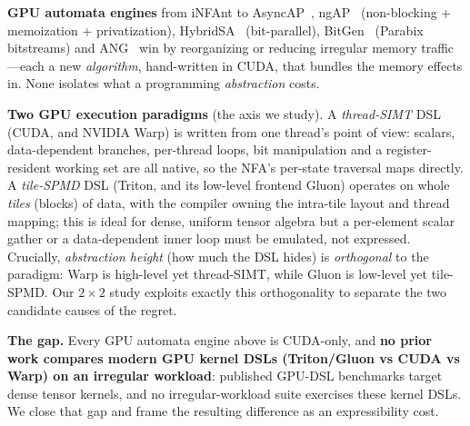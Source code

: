 \documentclass[conference]{IEEEtran}
\begin{document}
\textbf{GPU automata engines} from iNFAnt to AsyncAP~\cite{asyncap}, ngAP~\cite{ngap}
(non-blocking + memoization + privatization), HybridSA~\cite{hybridsa} (bit-parallel),
BitGen~\cite{bitgen} (Parabix bitstreams) and ANG~\cite{ang} win by reorganizing or reducing
irregular memory traffic---each a new \emph{algorithm}, hand-written in CUDA, that bundles the
memory effects in. None isolates what a programming \emph{abstraction} costs.

\textbf{Two GPU execution paradigms} (the axis we study). A \emph{thread-SIMT} DSL (CUDA, and
NVIDIA Warp) is written from one thread's point of view: scalars, data-dependent branches,
per-thread loops, bit manipulation and a register-resident working set are all native, so the
NFA's per-state traversal maps directly. A \emph{tile-SPMD} DSL (Triton, and its low-level
frontend Gluon) operates on whole \emph{tiles} (blocks) of data, with the compiler owning the
intra-tile layout and thread mapping; this is ideal for dense, uniform tensor algebra but a
per-element scalar gather or a data-dependent inner loop must be emulated, not expressed.
Crucially, \emph{abstraction height} (how much the DSL hides) is \emph{orthogonal} to the
paradigm: Warp is high-level yet thread-SIMT, while Gluon is low-level yet tile-SPMD. Our $2\times2$
study exploits exactly this orthogonality to separate the two candidate causes of the regret.

\textbf{The gap.} Every GPU automata engine above is CUDA-only, and \textbf{no prior work
compares modern GPU kernel DSLs (Triton/Gluon vs CUDA vs Warp) on an irregular workload}:
published GPU-DSL benchmarks target dense tensor kernels, and no irregular-workload suite
exercises these kernel DSLs. We close that gap and frame the resulting difference as an
expressibility cost.
\end{document}
